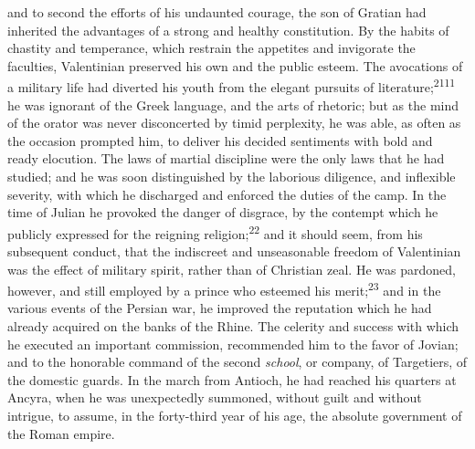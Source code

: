 and to second the efforts of his undaunted courage, the son of
Gratian had inherited the advantages of a strong and healthy
constitution. By the habits of chastity and temperance, which
restrain the appetites and invigorate the faculties, Valentinian
preserved his own and the public esteem. The avocations of a
military life had diverted his youth from the elegant pursuits of
literature;\textsuperscript{2111} he was ignorant of the Greek language, and the
arts of rhetoric; but as the mind of the orator was never
disconcerted by timid perplexity, he was able, as often as the
occasion prompted him, to deliver his decided sentiments with
bold and ready elocution. The laws of martial discipline were the
only laws that he had studied; and he was soon distinguished by
the laborious diligence, and inflexible severity, with which he
discharged and enforced the duties of the camp. In the time of
Julian he provoked the danger of disgrace, by the contempt which
he publicly expressed for the reigning religion;\textsuperscript{22} and it should
seem, from his subsequent conduct, that the indiscreet and
unseasonable freedom of Valentinian was the effect of military
spirit, rather than of Christian zeal. He was pardoned, however,
and still employed by a prince who esteemed his merit;\textsuperscript{23} and in
the various events of the Persian war, he improved the reputation
which he had already acquired on the banks of the Rhine. The
celerity and success with which he executed an important
commission, recommended him to the favor of Jovian; and to the
honorable command of the second \textit{school}, or company, of
Targetiers, of the domestic guards. In the march from Antioch, he
had reached his quarters at Ancyra, when he was unexpectedly
summoned, without guilt and without intrigue, to assume, in the
forty-third year of his age, the absolute government of the Roman
empire.



